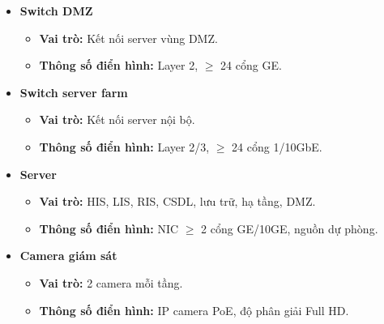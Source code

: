 \begin{itemize}
    \item \textbf{Switch DMZ}
    \begin{itemize}
        \item \textbf{Vai trò:} Kết nối server vùng DMZ.
        \item \textbf{Thông số điển hình:} Layer 2, $\geq$ 24 cổng GE.
    \end{itemize}

    \item \textbf{Switch server farm}
    \begin{itemize}
        \item \textbf{Vai trò:} Kết nối server nội bộ.
        \item \textbf{Thông số điển hình:} Layer 2/3, $\geq$ 24 cổng 1/10GbE.
    \end{itemize}

    \item \textbf{Server}
    \begin{itemize}
        \item \textbf{Vai trò:} HIS, LIS, RIS, CSDL, lưu trữ, hạ tầng, DMZ.
        \item \textbf{Thông số điển hình:} NIC $\geq$ 2 cổng GE/10GE, nguồn dự phòng.
    \end{itemize}

    \item \textbf{Camera giám sát}
    \begin{itemize}
        \item \textbf{Vai trò:} 2 camera mỗi tầng.
        \item \textbf{Thông số điển hình:} IP camera PoE, độ phân giải Full HD.
    \end{itemize}
\end{itemize}

